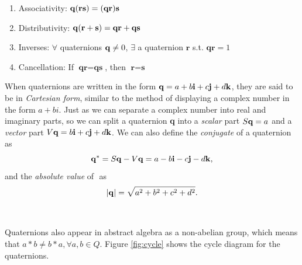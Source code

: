 \begin{thm}
\label{thm:mult}
\begin{enumerate} \textit{Properties of Quaternion Multiplication}
	\item Associativity: $\text{\textbf{q}} ( \textbf{r} \textbf{s}) = (\textbf{q} \textbf{r}) \textbf{s}$
	\item Distributivity: $\text{\textbf{q}} (\textbf{r} + \textbf{s}) = \textbf{q} \textbf{r} + \textbf{q} \textbf{s}$
	\item Inverses: $\forall$ quaternions $\text{\textbf{q}} \neq 0$, $\exists$ a quaternion $\textbf{r}$ s.t. $\textbf{qr} = 1$
	\item Cancellation: If $\textbf{qr}=\textbf{qs}$, then $\textbf{r} = \textbf{s}$
\end{enumerate}

\end{thm}

\noindent When quaternions are written in the form $\text{\textbf{q}} = a + b\text{\textbf{i}} + c\text{\textbf{j}} + d\text{\textbf{k}}$, they are said to be in \textit{Cartesian form}, similar to the method of displaying a complex number in the form $a + bi$.
Just as we can separate a complex number into real and imaginary parts, so we can split a quaternion \textbf{q} into a \textit{scalar} part $S\text{\textbf{q}} = a$ and a \textit{vector} part $V\text{\textbf{q}} = b\text{\textbf{i}} + c\text{\textbf{j}} + d\text{\textbf{k}}$.
We can also define the \textit{conjugate} of a quaternion as $$ \text{\textbf{q}}^* = S\text{\textbf{q}} - V\text{\textbf{q}} = a - b\text{\textbf{i}} - c\text{\textbf{j}} - d\text{\textbf{k}},$$ and the \textit{absolute value} of \qq$ $ as $$ \lvert\text{\textbf{q}}\rvert = \sqrt{a^2 + b^2 + c^2 + d^2}.$$
\\ \\
\noindent Quaternions also appear in abstract algebra as a non-abelian group, which means that $a * b \neq b * a, \forall a,b \in Q$.
Figure \ref{fig:cycle} shows the cycle diagram for the quaternions.

